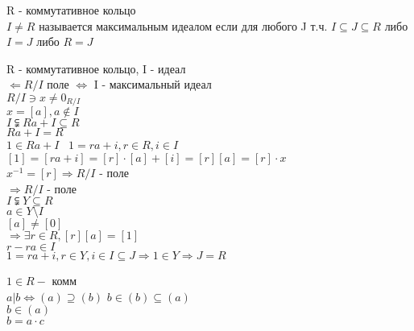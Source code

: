 R - коммутативное кольцо \\
$ I \neq R $ называется максимальным идеалом если для любого J т.ч. $ I \subseteq J \subseteq R $ либо $ I = J $ либо $ R = J $ \\
\begin{theorem}
	R - коммутативное кольцо, I - идеал \\
	$ \Leftarrow R / I $ поле $ \Leftrightarrow $ I - максимальный идеал \\
	$ R / I \ni x \neq 0_{R /I} $ \\
	$ x = [a], a \notin I $ \\
	$ I \subsetneqq Ra + I \subseteq R $\\
	$ Ra + I = R $ \\
	$ 1 \in Ra + I $ \
	$ 1 = ra + i, r \in R, i \in I $\\
	$ [1] = [ra + i] = [r] \cdot [a] + [i] = [r][a] = [r]\cdot x $\\
	$ x^{-1}  = [r] \Rightarrow R / I $ - поле \\
	$ \Rightarrow R / I $ - поле \\
	$ I \subsetneqq Y \subseteq R $ \\
	$ a \in Y \setminus I $ \\
	$ [a] \neq [0] $ \\
	$ \Rightarrow \exists r \in R, [r] [a] = [1] $ \\
	$ r - ra \in I $ \\
	$ 1 = ra + i, r \in Y, i \in I \subseteq J \Rightarrow 1 \in Y  \Rightarrow J = R $ 
\end{theorem}
 
 $ 1 \in R - $ комм \\
 $ a | b \Leftrightarrow (a) \supseteq (b) $ 
 $ b \in (b) \subseteq (a) $ \\
 $ b \in (a) $ \\
 $ b = a \cdot c $ 








   